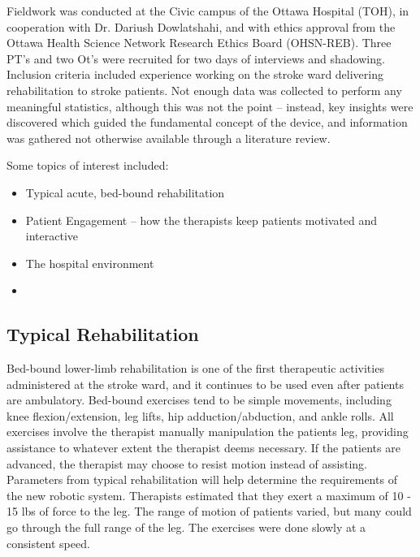 \documentclass[12pt]{report}
\begin{document}
	Fieldwork was conducted at the Civic campus of the Ottawa Hospital (TOH), in cooperation with Dr. Dariush Dowlatshahi, and with ethics approval from the Ottawa Health Science Network Research Ethics Board (OHSN-REB). Three PT's and two Ot's were recruited for two days of interviews and shadowing. Inclusion criteria included experience working on the stroke ward delivering rehabilitation to stroke patients. Not enough data was collected to perform any meaningful statistics, although this was not the point -- instead, key insights were discovered which guided the fundamental concept of the device, and information was gathered not otherwise available through a literature review. 
	
	Some topics of interest included:
	
	\begin{itemize}
		\item Typical acute, bed-bound rehabilitation 
		\item Patient Engagement -- how the therapists keep patients motivated and interactive
		\item The hospital environment 
		\item 
	\end{itemize}

	
	\subsection{Typical Rehabilitation}
	
	Bed-bound lower-limb rehabilitation is one of the first therapeutic activities administered at the stroke ward, and it continues to be used even after patients are ambulatory. Bed-bound exercises tend to be simple movements, including knee flexion/extension, leg lifts, hip adduction/abduction, and ankle rolls. All exercises involve the therapist manually manipulation the patients leg, providing assistance to whatever extent the therapist deems necessary. If the patients are advanced, the therapist may choose to resist motion instead of assisting. 
	Parameters from typical rehabilitation will help determine the requirements of the new robotic system. Therapists estimated that they exert a maximum of 10 - 15 lbs of force to the leg. The range of motion of patients varied, but many could go through the full range of the leg. The exercises were done slowly at a consistent speed. 
	
\end{document}
